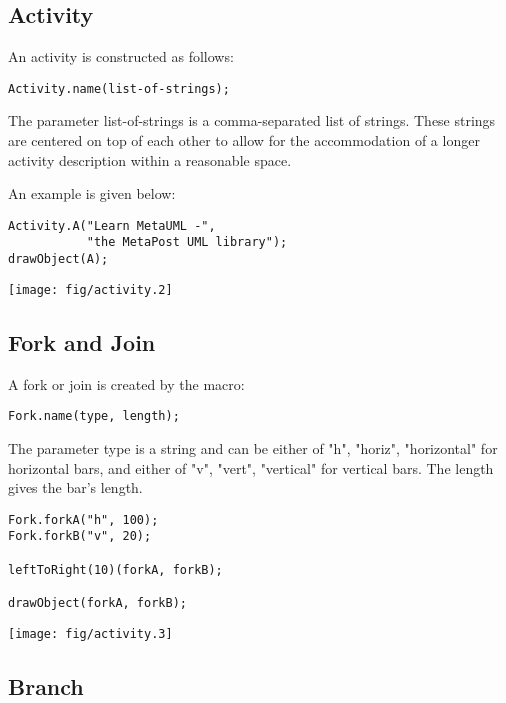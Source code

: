 \documentclass{article}
\newcommand{\code}{\ttfamily}
\begin{document}
\subsection{Activity}

An activity is constructed as follows:
\begin{verbatim}
Activity.name(list-of-strings);
\end{verbatim}

The parameter {\code list-of-strings} is a comma-separated list of strings. These strings are
centered on top of each other to allow for the accommodation of a longer activity description
within a reasonable space.

An example is given below:

\begin{multicols}{2}
\begin{verbatim}
Activity.A("Learn MetaUML -",
           "the MetaPost UML library");
drawObject(A);
\end{verbatim}
\columnbreak
\hspace{1cm}\texttt{[image: fig/activity.2]}
\end{multicols}

\subsection{Fork and Join}

A fork or join is created by the macro:

\begin{verbatim}
Fork.name(type, length);
\end{verbatim}

The parameter {\code type} is a string and can be either of {\code "h"}, {\code "horiz"}, {\code "horizontal"}
for horizontal bars, and either of {\code "v"}, {\code "vert"}, {\code "vertical"} for vertical bars.
The {\code length} gives the bar's length.

\begin{multicols}{2}
\begin{verbatim}
Fork.forkA("h", 100);
Fork.forkB("v", 20);

leftToRight(10)(forkA, forkB);

drawObject(forkA, forkB);
\end{verbatim}
\columnbreak
\hspace{1cm}\texttt{[image: fig/activity.3]}
\end{multicols}

\subsection{Branch}
\end{document}

